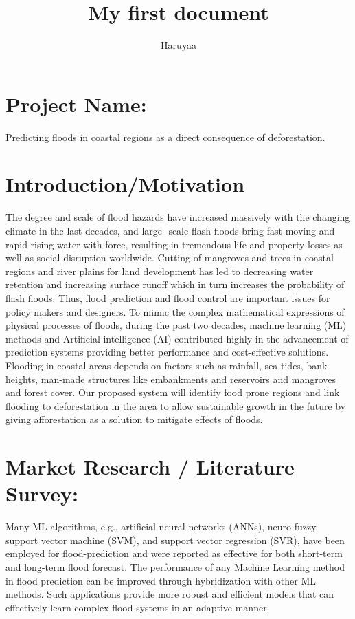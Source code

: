 \documentclass{article}
\title{My first document}
\author{Haruyaa}
\begin{document}
	\maketitle
	\section*{Project Name:}
		Predicting floods in coastal regions as a direct consequence of deforestation.
	\section*{Introduction/Motivation}
		The degree and scale of flood hazards have increased massively with the changing climate in the last decades, and large-		scale flash floods bring fast-moving and rapid-rising water with force, resulting in tremendous life and property losses as well as social disruption worldwide. Cutting of mangroves and trees in coastal regions and river plains for land development has led to decreasing water retention and increasing surface runoff which in turn increases the probability of flash floods. Thus, flood prediction and flood control are important issues for policy makers and designers. To mimic the complex mathematical expressions of physical processes of floods, during the past two decades, machine learning (ML) methods and Artificial intelligence (AI) contributed highly in the advancement of prediction systems providing better performance and cost-effective solutions.
Flooding in coastal areas depends on factors such as rainfall, sea tides, bank heights, man-made structures like embankments and reservoirs and mangroves and forest cover. Our proposed system will identify food prone regions and link flooding to deforestation in the area to allow sustainable growth in the future by giving afforestation as a solution to mitigate effects of floods.   
	\section*{Market Research / Literature Survey:}
		Many ML algorithms, e.g., artificial neural networks (ANNs), neuro-fuzzy, support vector machine (SVM), and support vector regression (SVR), have been employed for flood-prediction and were reported as effective for both short-term and long-term flood forecast. 
The performance of any Machine Learning method in flood prediction can be improved through hybridization with other ML methods. Such applications provide more robust and efficient models that can effectively learn complex flood systems in an adaptive manner. 
\end{document}
